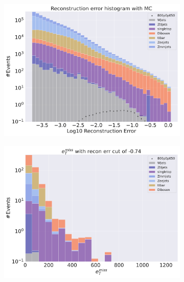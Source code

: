 \begin{figure}[H]
    \centering
    \begin{subfigure}{.40\textwidth}
        \includegraphics[width=\textwidth]{Figures/AE_testing/big/2lep/b_data_recon_big_rm3_feats_sig_800p0p050_.pdf}
        \caption{ }
        \label{fig:AE_2lep_big_800_3}
    \end{subfigure}
    \hfill
    \begin{subfigure}{.40\textwidth}
        \includegraphics[width=\textwidth]{Figures/AE_testing/big/2lep/b_data_recon_big_rm3_feats_sig_800p0p050_recon_errcut_-0.74.pdf}
        \caption{}
        \label{fig:AE_2lep_big_etmiss_800_3}
    \end{subfigure}
    \hfill
      

\end{figure}
